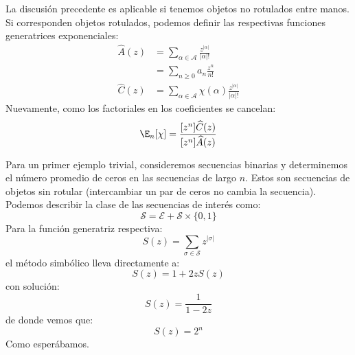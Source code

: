   La discusión precedente es aplicable
  si tenemos objetos no rotulados entre manos.
  Si corresponden objetos rotulados,
  podemos definir las respectivas funciones generatrices exponenciales:
  \begin{align}
    \widehat{A}(z)
      &= \sum_{\alpha \in \mathcal{A}}
	   \frac{z^{\lvert \alpha \rvert}}{\lvert \alpha \rvert !}
		\label{eq:Ahat-def} \\
      &= \sum_{n \ge 0} a_n \frac{z^n}{n!}
		\label{eq:Ahat-an} \\
    \widehat{C}(z)
      &= \sum_{\alpha \in \mathcal{A}}
	   \chi(\alpha) \frac{z^{\lvert \alpha \rvert}}{\lvert \alpha \rvert !}
		\label{eq:Chat-def}
  \end{align}
  Nuevamente,
  como los factoriales en los coeficientes se cancelan:
  \begin{equation}
    \label{eq:chi-expected-hat}
    \E_n[\chi]
      = \frac{[z^n] \widehat{C}(z)}{[z^n] \widehat{A}(z)}
  \end{equation}

  Para un primer ejemplo trivial,
  consideremos secuencias binarias%
  y determinemos el número promedio de ceros
  en las secuencias de largo \(n\).
  Estos son secuencias de objetos sin rotular
  (intercambiar un par de ceros no cambia la secuencia).
  Podemos describir la clase de las secuencias de interés como:
  \begin{equation}
    \label{eq:binary-sequence}
    \mathcal{S}
      = \mathcal{E} + \mathcal{S} \times \{0, 1\}
  \end{equation}
  Para la función generatriz respectiva:
  \begin{equation}
    \label{eq:S-def}
    S(z)
      = \sum_{\sigma \in \mathcal{S}} z^{\lvert \sigma \rvert}
  \end{equation}
  el método simbólico lleva directamente a:%
  \begin{equation*}
    S(z)
       = 1 + 2 z S(z)
  \end{equation*}
  con solución:
  \begin{equation}
    \label{eq:S-soln}
    S(z)
      = \frac{1}{1 - 2 z}
  \end{equation}
  de donde vemos que:%
  \begin{equation*}
    [z^n] S(z)
      = 2^n
  \end{equation*}
  Como esperábamos.

